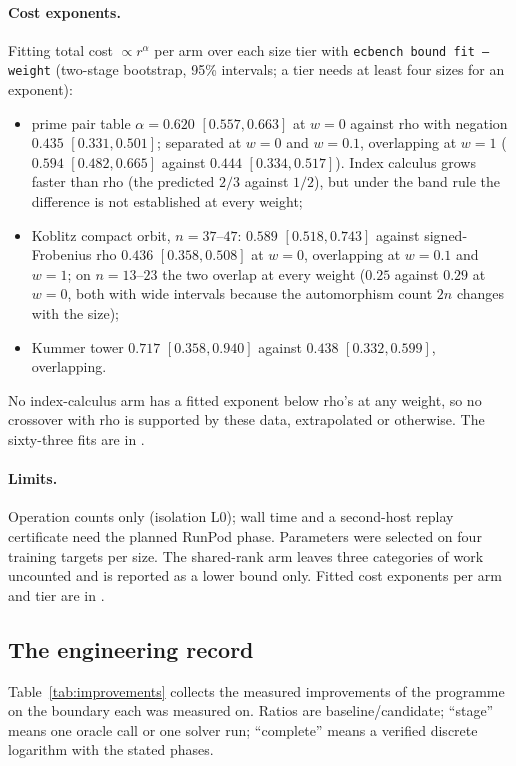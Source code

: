 \paragraph{Cost exponents.} Fitting total cost $\propto r^{\alpha}$ per
arm over each size tier with \texttt{ecbench bound fit --weight}
(two-stage bootstrap, 95\% intervals; a tier needs at least four sizes for
an exponent):
\begin{itemize}
\item prime pair table $\alpha=0.620$ $[0.557,0.663]$ at $w=0$ against
  rho with negation $0.435$ $[0.331,0.501]$; separated at $w=0$ and
  $w=0.1$, overlapping at $w=1$ ($0.594$ $[0.482,0.665]$ against $0.444$
  $[0.334,0.517]$). Index calculus grows faster than rho (the predicted
  $2/3$ against $1/2$), but under the band rule the difference is not
  established at every weight;
\item Koblitz compact orbit, $n=37$--$47$: $0.589$ $[0.518,0.743]$ against
  signed-Frobenius rho $0.436$ $[0.358,0.508]$ at $w=0$, overlapping at
  $w=0.1$ and $w=1$; on $n=13$--$23$ the two overlap at every weight
  ($0.25$ against $0.29$ at $w=0$, both with wide intervals because the
  automorphism count $2n$ changes with the size);
\item Kummer tower $0.717$ $[0.358,0.940]$ against $0.438$
  $[0.332,0.599]$, overlapping.
\end{itemize}
No index-calculus arm has a fitted exponent below rho's at any weight, so
no crossover with rho is supported by these data, extrapolated or
otherwise. The sixty-three fits are in
.

\paragraph{Limits.} Operation counts only (isolation L0); wall time and a
second-host replay certificate need the planned RunPod phase. Parameters
were selected on four training targets per size. The shared-rank arm
leaves three categories of work uncounted and is reported as a lower
bound only. Fitted cost exponents per arm and tier are in
.

\subsection{The engineering record}

Table~\ref{tab:improvements} collects the measured improvements of the
programme on the boundary each was measured on. Ratios are
baseline/candidate; ``stage'' means one oracle call or one solver run;
``complete'' means a verified discrete logarithm with the stated phases.

